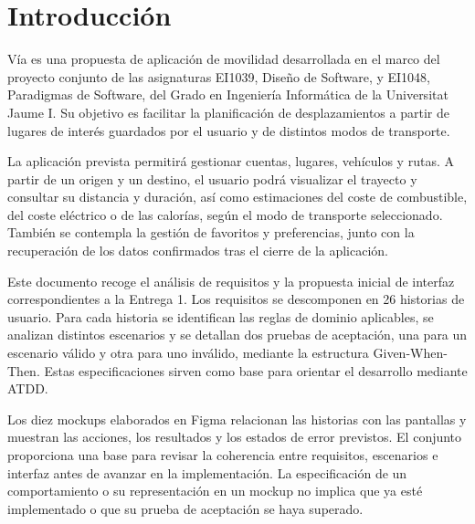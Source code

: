 \clearpage\section{Introducción}\label{sec1}

Vía es una propuesta de aplicación de movilidad desarrollada en el marco del proyecto conjunto de las asignaturas EI1039, Diseño de Software, y EI1048, Paradigmas de Software, del Grado en Ingeniería Informática de la Universitat Jaume I. Su objetivo es facilitar la planificación de desplazamientos a partir de lugares de interés guardados por el usuario y de distintos modos de transporte.\par

La aplicación prevista permitirá gestionar cuentas, lugares, vehículos y rutas. A partir de un origen y un destino, el usuario podrá visualizar el trayecto y consultar su distancia y duración, así como estimaciones del coste de combustible, del coste eléctrico o de las calorías, según el modo de transporte seleccionado. También se contempla la gestión de favoritos y preferencias, junto con la recuperación de los datos confirmados tras el cierre de la aplicación.\par

Este documento recoge el análisis de requisitos y la propuesta inicial de interfaz correspondientes a la Entrega 1. Los requisitos se descomponen en 26 historias de usuario. Para cada historia se identifican las reglas de dominio aplicables, se analizan distintos escenarios y se detallan dos pruebas de aceptación, una para un escenario válido y otra para uno inválido, mediante la estructura Given-When-Then. Estas especificaciones sirven como base para orientar el desarrollo mediante ATDD.\par

Los diez mockups elaborados en Figma relacionan las historias con las pantallas y muestran las acciones, los resultados y los estados de error previstos. El conjunto proporciona una base para revisar la coherencia entre requisitos, escenarios e interfaz antes de avanzar en la implementación. La especificación de un comportamiento o su representación en un mockup no implica que ya esté implementado o que su prueba de aceptación se haya superado.\par

